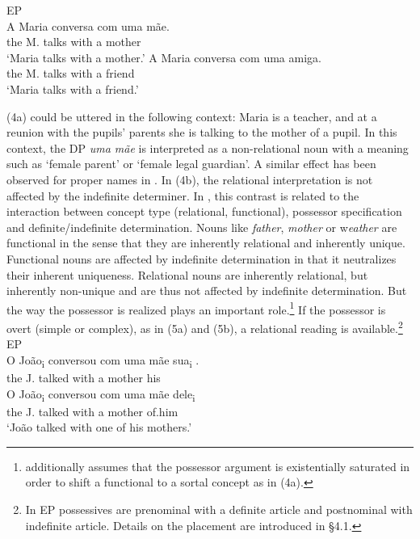 \documentclass[output=paper]{langsci/langscibook}
\begin{document}
\ea%
    EP\label{ex:wein:4}\\
    \ea 
    \gll A Maria conversa com uma mãe.\\
         the M. talks with a mother\\
    \glt ‘Maria talks with a mother.’
    \ex  
    \gll A Maria conversa com uma amiga.\\
         the M. talks with a friend\\
    \glt ‘Maria talks with a friend.’
    \z
\z

(4a) could be uttered in the following context: Maria is a teacher, and at a reunion with the pupils’ parents she is talking to the mother of a pupil. In this context, the DP \textit{uma mãe} is interpreted as a non-relational noun with a meaning such as ‘female parent’ or ‘female legal guardian’. A similar effect has been observed for proper names in \citet{Longobardi1994}. In (4b), the relational interpretation is not affected by the indefinite determiner. In \citet{Löbner2011}, this contrast is related to the interaction between concept type (relational, functional), possessor specification and definite/indefinite determination. Nouns like \textit{father}, \textit{mother} or w\textit{eather} are functional in the sense that they are inherently relational and inherently unique. Functional nouns are affected by indefinite determination in that it neutralizes their inherent uniqueness. Relational nouns are inherently relational, but inherently non-unique and are thus not affected by indefinite determination. But the way the possessor is realized plays an important role.\footnote{\citet{Löbner2011} additionally assumes that the possessor argument is existentially saturated in order to shift a functional to a sortal concept as in (4a).} If the possessor is overt (simple or complex), as in (5a) and (5b), a relational reading is available.\footnote{In EP possessives are prenominal with a definite article and postnominal with indefinite article. Details on the placement are introduced in §4.1.}
\ea%
    EP\label{ex:wein:5}\\
    \ea
    \gll O João\textsubscript{i} conversou com uma mãe sua\textsubscript{i} .  \\
         the J.   talked   with a mother his\\
    \ex  
    \gll O João\textsubscript{i} conversou com uma mãe dele\textsubscript{i} \\
         the J. talked    with a mother of.him \\
    \glt ‘João talked with one of his mothers.’ 
    \z
\z
\end{document}
